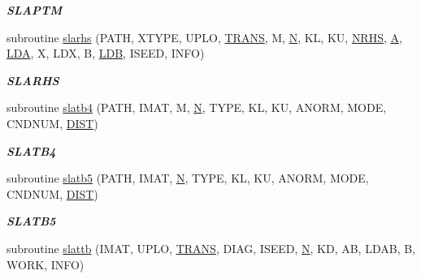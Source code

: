 \begin{DoxyCompactItemize}
\begin{DoxyCompactList}\small\item\em {\bfseries S\+L\+A\+P\+T\+M} \end{DoxyCompactList}\item 
subroutine \hyperlink{group__single__lin_ga67befe1509ef6eaf403bedf1c4bf4058}{slarhs} (P\+A\+T\+H, X\+T\+Y\+P\+E, U\+P\+L\+O, \hyperlink{superlu__enum__consts_8h_a0c4e17b2d5cea33f9991ccc6a6678d62a1f61e3015bfe0f0c2c3fda4c5a0cdf58}{T\+R\+A\+N\+S}, M, \hyperlink{polmisc_8c_a0240ac851181b84ac374872dc5434ee4}{N}, K\+L, K\+U, \hyperlink{example__user_8c_aa0138da002ce2a90360df2f521eb3198}{N\+R\+H\+S}, \hyperlink{classA}{A}, \hyperlink{example__user_8c_ae946da542ce0db94dced19b2ecefd1aa}{L\+D\+A}, X, L\+D\+X, B, \hyperlink{example__user_8c_a50e90a7104df172b5a89a06c47fcca04}{L\+D\+B}, I\+S\+E\+E\+D, I\+N\+F\+O)
\begin{DoxyCompactList}\small\item\em {\bfseries S\+L\+A\+R\+H\+S} \end{DoxyCompactList}\item 
subroutine \hyperlink{group__single__lin_ga162c6270cceeae549b6e7a1438618dab}{slatb4} (P\+A\+T\+H, I\+M\+A\+T, M, \hyperlink{polmisc_8c_a0240ac851181b84ac374872dc5434ee4}{N}, T\+Y\+P\+E, K\+L, K\+U, A\+N\+O\+R\+M, M\+O\+D\+E, C\+N\+D\+N\+U\+M, \hyperlink{superlu__enum__consts_8h_af00a42ecad444bbda75cde1b64bd7e72ac04fbbdf0d80a4ad25e565541deeebd7}{D\+I\+S\+T})
\begin{DoxyCompactList}\small\item\em {\bfseries S\+L\+A\+T\+B4} \end{DoxyCompactList}\item 
subroutine \hyperlink{group__single__lin_gaf19f8d70411c78c54ead5538ccb2cf3d}{slatb5} (P\+A\+T\+H, I\+M\+A\+T, \hyperlink{polmisc_8c_a0240ac851181b84ac374872dc5434ee4}{N}, T\+Y\+P\+E, K\+L, K\+U, A\+N\+O\+R\+M, M\+O\+D\+E, C\+N\+D\+N\+U\+M, \hyperlink{superlu__enum__consts_8h_af00a42ecad444bbda75cde1b64bd7e72ac04fbbdf0d80a4ad25e565541deeebd7}{D\+I\+S\+T})
\begin{DoxyCompactList}\small\item\em {\bfseries S\+L\+A\+T\+B5} \end{DoxyCompactList}\item 
subroutine \hyperlink{group__single__lin_ga7ff6a4092ede78f17c92fb34fe42223f}{slattb} (I\+M\+A\+T, U\+P\+L\+O, \hyperlink{superlu__enum__consts_8h_a0c4e17b2d5cea33f9991ccc6a6678d62a1f61e3015bfe0f0c2c3fda4c5a0cdf58}{T\+R\+A\+N\+S}, D\+I\+A\+G, I\+S\+E\+E\+D, \hyperlink{polmisc_8c_a0240ac851181b84ac374872dc5434ee4}{N}, K\+D, A\+B, L\+D\+A\+B, B, W\+O\+R\+K, I\+N\+F\+O)

\end{DoxyCompactItemize}
